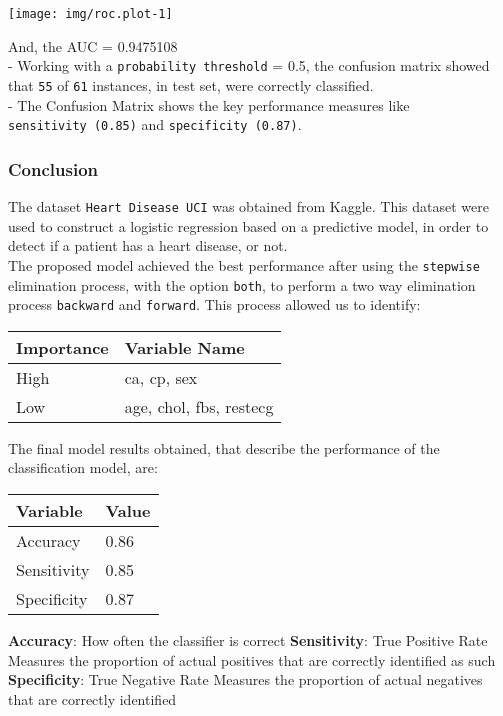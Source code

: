 \documentclass[]{article}
\begin{document}
\begin{center}\texttt{[image: img/roc.plot-1]} \end{center}

And, the AUC = 0.9475108\\
- Working with a \texttt{probability\ threshold} = 0.5, the confusion
matrix showed that \texttt{55} of \texttt{61} instances, in test set,
were correctly classified.\\
- The Confusion Matrix shows the key performance measures like
\texttt{sensitivity\ (0.85)} and \texttt{specificity\ (0.87)}.

\hypertarget{conclusion}{%
\subsubsection{Conclusion}\label{conclusion}}

The dataset \texttt{Heart\ Disease\ UCI} was obtained from Kaggle. This
dataset were used to construct a logistic regression based on a
predictive model, in order to detect if a patient has a heart disease,
or not.\\
The proposed model achieved the best performance after using the
\texttt{stepwise} elimination process, with the option \texttt{both}, to
perform a two way elimination process \texttt{backward} and
\texttt{forward}. This process allowed us to identify:

\begin{longtable}[]{@{}ll@{}}
\toprule
Importance & Variable Name\tabularnewline
\midrule
\endhead
High & ca, cp, sex\tabularnewline
Low & age, chol, fbs, restecg\tabularnewline
\bottomrule
\end{longtable}

The final model results obtained, that describe the performance of the
classification model, are:

\begin{longtable}[]{@{}ll@{}}
\toprule
Variable & Value\tabularnewline
\midrule
\endhead
Accuracy & 0.86\tabularnewline
Sensitivity & 0.85\tabularnewline
Specificity & 0.87\tabularnewline
\bottomrule
\end{longtable}

\textbf{Accuracy}: How often the classifier is correct
\textbf{Sensitivity}: True Positive Rate Measures the proportion of
actual positives that are correctly identified as such
\textbf{Specificity}: True Negative Rate Measures the proportion of
actual negatives that are correctly identified

\pagebreak
\end{document}
